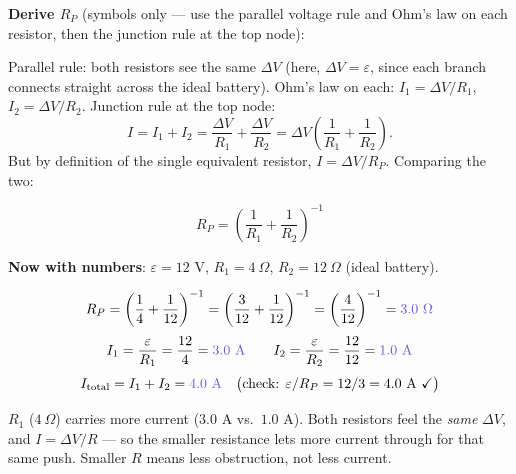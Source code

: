 \documentclass[12pt]{article}
\newcommand{\ANS}[1]{\textcolor{accent}{#1}}
\begin{document}
\textbf{Derive $R_P$} (symbols only --- use the parallel voltage rule and
Ohm's law on each resistor, then the junction rule at the top node):

{\small
Parallel rule: both resistors see the same $\Delta V$ (here, $\Delta
V=\varepsilon$, since each branch connects straight across the ideal
battery). Ohm's law on each: $I_1=\Delta V/R_1$, $I_2=\Delta V/R_2$.
Junction rule at the top node:
\[
I = I_1+I_2 = \dfrac{\Delta V}{R_1}+\dfrac{\Delta V}{R_2}
= \Delta V\left(\dfrac1{R_1}+\dfrac1{R_2}\right).
\]
But by definition of the single equivalent resistor, $I=\Delta V/R_P$.
Comparing the two:}

\[
\boxed{R_P = \left(\dfrac1{R_1}+\dfrac1{R_2}\right)^{-1}}
\]

\textbf{Now with numbers}: $\varepsilon=12$ V, $R_1=4\ \Omega$,
$R_2=12\ \Omega$ (ideal battery).

\[
R_P = \left(\dfrac14+\dfrac1{12}\right)^{-1} = \left(\dfrac{3}{12}+\dfrac1{12}\right)^{-1}
= \left(\dfrac{4}{12}\right)^{-1} = \ANS{3.0\ \Omega}
\]
\[
I_1 = \dfrac{\varepsilon}{R_1} = \dfrac{12}{4} = \ANS{3.0\text{ A}}
\qquad
I_2 = \dfrac{\varepsilon}{R_2} = \dfrac{12}{12} = \ANS{1.0\text{ A}}
\]
\[
I_{\text{total}} = I_1+I_2 = \ANS{4.0\text{ A}}
\quad\big(\text{check: } \varepsilon/R_P = 12/3 = 4.0\text{ A}\ \checkmark\big)
\]


{\small\color{accent} $R_1$ ($4\ \Omega$) carries more current ($3.0$ A vs.\
$1.0$ A). Both resistors feel the \emph{same} $\Delta V$, and $I=\Delta
V/R$ --- so the smaller resistance lets more current through for that same
push. Smaller $R$ means less obstruction, not less current.}
\end{document}
